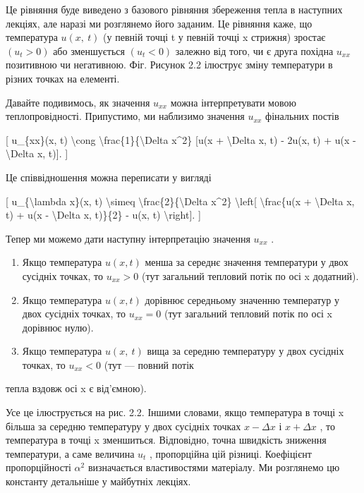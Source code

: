\documentclass[
]{article}
\begin{document}
Це рівняння буде виведено з базового рівняння збереження тепла в
наступних лекціях, але наразі ми розглянемо його заданим. Це рівняння
каже, що температура \(u\left(x,\ t\right)\) (у певній точці t у певній
точці x стрижня) зростає \((u_t>0)\) або зменшується \((u_t<0)\) залежно
від того, чи є друга похідна \(u_{xx}\) позитивною чи негативною. Фіг.
Рисунок 2.2 ілюструє зміну температури в різних точках на елементі.

Давайте подивимось, як значення \(u_{xx}\) можна інтерпретувати мовою
теплопровідності. Припустимо, ми наблизимо значення \(u_{xx}\) фінальних
постів

{[} u\_\{xx\}(x, t) \textbackslash cong
\textbackslash frac\{1\}\{\textbackslash Delta x\^{}2\} {[}u(x +
\textbackslash Delta x, t) - 2u(x, t) + u(x - \textbackslash Delta x,
t){]}. {]}

Це співвідношення можна переписати у вигляді

{[} u\_\{\textbackslash lambda x\}(x, t) \textbackslash simeq
\textbackslash frac\{2\}\{\textbackslash Delta x\^{}2\}
\textbackslash left{[} \textbackslash frac\{u(x + \textbackslash Delta
x, t) + u(x - \textbackslash Delta x, t)\}\{2\} - u(x, t)
\textbackslash right{]}. {]}

Тепер ми можемо дати наступну інтерпретацію значення \(u_{xx}\) .

\begin{enumerate}
\def\labelenumi{\arabic{enumi}.}
\item
  Якщо температура \(u(x, t)\) менша за середнє значення температури у
  двох сусідніх точках, то \(u_{xx} > 0\) (тут загальний тепловий потік
  по осі x додатний).
\item
  Якщо температура \(u(x, t)\) дорівнює середньому значенню температур у
  двох сусідніх точках, то \(u_{xx} = 0\) (тут загальний тепловий потік
  по осі x дорівнює нулю).
\item
  Якщо температура \(u\left(x,\ t\right)\) вища за середню температуру у
  двох сусідніх точках, то \(u_{xx}<0\) (тут --- повний потік
\end{enumerate}

тепла вздовж осі x є від'ємною).

Усе це ілюструється на рис. 2.2. Іншими словами, якщо температура в
точці x більша за середню температуру у двох сусідніх точках
\(x - \Delta x\) і \(x + \Delta x\) , то температура в точці x
зменшиться. Відповідно, точна швидкість зниження температури, а саме
величина \(u_t\) , пропорційна цій різниці. Коефіцієнт пропорційності
\(\alpha^2\) визначається властивостями матеріалу. Ми розглянемо цю
константу детальніше у майбутніх лекціях.
\end{document}
